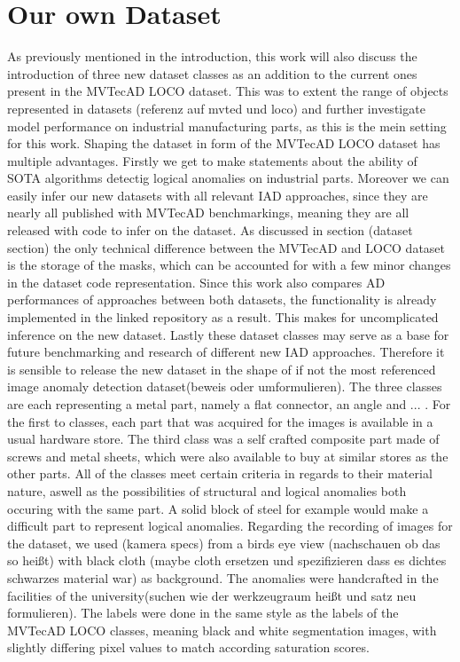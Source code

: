 \section{Our own Dataset}
As previously mentioned in the introduction, this work will also discuss the introduction of three new dataset classes as an addition to the current ones present in the MVTecAD LOCO dataset.
This was to extent the range of objects represented in datasets (referenz auf mvted und loco) and further investigate model performance on industrial manufacturing parts, as this is the 
mein setting for this work. Shaping the dataset in form of the MVTecAD LOCO dataset has multiple advantages. Firstly we get to make statements about the ability of SOTA algorithms detectig 
logical anomalies on industrial parts. Moreover we can easily infer our new datasets with all relevant IAD approaches, since they are nearly all published with MVTecAD benchmarkings, meaning 
they are all released with code to infer on the dataset. As discussed in section (dataset section) the only technical difference between the MVTecAD and LOCO dataset is the storage of the masks, 
which can be accounted for with a few minor changes in the dataset code representation. Since this work also compares AD performances of approaches between both datasets, the functionality 
is already implemented in the linked repository as a result. This makes for uncomplicated inference on the new dataset. Lastly these dataset classes may serve as a base for future benchmarking 
and research of different new IAD approaches. Therefore it is sensible to release the new dataset in the shape of if not the most referenced image anomaly detection dataset(beweis oder umformulieren). 
The three classes are each representing a metal part, namely a flat connector, an angle and ... . For the first to classes, each part that was acquired for the images is available in a 
usual hardware store. The third class was a self crafted composite part made of screws and metal sheets, which were also available to buy at similar stores as the other parts. All of the classes 
meet certain criteria in regards to their material nature, aswell as the possibilities of structural and logical anomalies both occuring with the same part. A solid block of steel for example 
would make a difficult part to represent logical anomalies.
Regarding the recording of images for the dataset, we used (kamera specs) from a birds eye view (nachschauen ob das so heißt) with black cloth (maybe cloth ersetzen und spezifizieren dass es 
dichtes schwarzes material war) as background. The anomalies were handcrafted in the facilities of the university(suchen wie der werkzeugraum heißt und satz neu formulieren). The labels 
were done in the same style as the labels of the MVTecAD LOCO classes, meaning black and white segmentation images, with slightly differing pixel values to match according saturation scores. 

